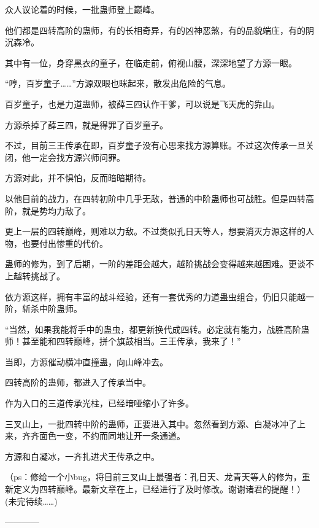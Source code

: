 \begin{this_body}
众人议论着的时候，一批蛊师登上巅峰。

他们都是四转高阶的蛊师，有的长相奇异，有的凶神恶煞，有的品貌端庄，有的阴沉森冷。

其中有一位，身穿黑衣的童子，在临走前，俯视山腰，深深地望了方源一眼。

“哼，百岁童子……”方源双眼也眯起来，散发出危险的气息。

百岁童子，也是力道蛊师，被薛三四认作干爹，可以说是飞天虎的靠山。

方源杀掉了薛三四，就是得罪了百岁童子。

不过，目前三王传承在即，百岁童子没有心思来找方源算账。不过这次传承一旦关闭，他一定会找方源兴师问罪。

方源对此，并不惧怕，反而暗暗期待。

以他目前的战力，在四转初阶中几乎无敌，普通的中阶蛊师也可战胜。但是四转高阶，就是势均力敌了。

更上一层的四转巅峰，则难以力敌。不过类似孔日天等人，想要消灭方源这样的人物，也要付出惨重的代价。

蛊师的修为，到了后期，一阶的差距会越大，越阶挑战会变得越来越困难。更谈不上越转挑战了。

依方源这样，拥有丰富的战斗经验，还有一套优秀的力道蛊虫组合，仍旧只能越一阶，斩杀中阶蛊师。

“当然，如果我能将手中的蛊虫，都更新换代成四转。必定就有能力，战胜高阶蛊师！甚至能和四转巅峰，拼个旗鼓相当。三王传承，我来了！”

当即，方源催动横冲直撞蛊，向山峰冲去。

四转高阶的蛊师，都进入了传承当中。

作为入口的三道传承光柱，已经暗哑缩小了许多。

三叉山上，一批四转中阶的蛊师，正要进入其中。忽然看到方源、白凝冰冲了上来，齐齐面色一变，不约而同地让开一条通道。

方源和白凝冰，一齐扎进犬王传承之中。

（ps：修给一个小bug，将目前三叉山上最强者：孔日天、龙青天等人的修为，重新定义为四转巅峰。最新文章在上，已经进行了及时修改。谢谢诸君的提醒！）(未完待续……)

------------

\end{this_body}

